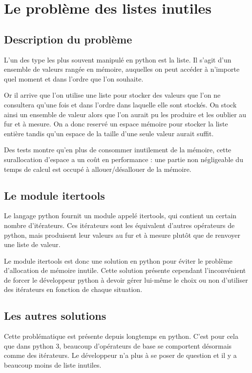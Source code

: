 \documentclass[a4paper]{article}
\begin{document}
\section*{Le problème des listes inutiles}

\subsection*{Description du problème}

L'un des type les plus souvent manipulé en python est la liste. Il
s'agit d'un ensemble de valeurs rangée en mémoire, auquelles on peut
accéder à n'importe quel moment et dans l'ordre que l'on souhaite.

Or il arrive que l'on utilise une liste pour stocker des valeurs que
l'on ne consultera qu'une fois et dans l'ordre dans laquelle elle sont
stockés. On stock ainsi un ensemble de valeur alors que l'on aurait pu
les produire et les oublier au fur et à mesure. On a donc reservé un
espace mémoire pour stocker la liste entière tandis qu'un espace de la
taille d'une seule valeur aurait suffit.

Des tests montre qu'en plus de consommer inutilement de la mémoire,
cette surallocation d'espace a un coût en performance : une partie non
négligeable du temps de calcul est occupé à allouer/désallouer de la
mémoire.

\subsection*{Le module itertools}

Le langage python fournit un module appelé itertools, qui contient un
certain nombre d'itérateurs. Ces itérateurs sont les équivalent
d'autres opérateurs de python, mais produisent leur valeurs au fur et
à mesure plutôt que de renvoyer une liste de valeur.

Le module itertools est donc une solution en python pour éviter le
problème d'allocation de mémoire inutile. Cette solution présente
cependant l'inconvénient de forcer le développeur python à devoir
gérer lui-même le choix ou non d'utiliser des itérateurs en fonction
de chaque situation. 

\subsection*{Les autres solutions }

Cette problématique est présente depuis longtemps en python. C'est
pour cela que dans python 3, beaucoup d'opérateurs de base se
comportent désormais comme des itérateurs. Le développeur n'a plus à
se poser de question et il y a beaucoup moins de liste inutiles.
\end{document}
